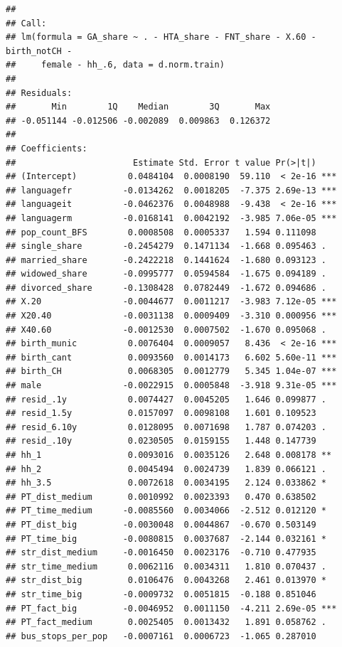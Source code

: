\documentclass[
]{article}
\begin{document}
\begin{verbatim}
## 
## Call:
## lm(formula = GA_share ~ . - HTA_share - FNT_share - X.60 - birth_notCH - 
##     female - hh_.6, data = d.norm.train)
## 
## Residuals:
##       Min        1Q    Median        3Q       Max 
## -0.051144 -0.012506 -0.002089  0.009863  0.126372 
## 
## Coefficients:
##                       Estimate Std. Error t value Pr(>|t|)    
## (Intercept)          0.0484104  0.0008190  59.110  < 2e-16 ***
## languagefr          -0.0134262  0.0018205  -7.375 2.69e-13 ***
## languageit          -0.0462376  0.0048988  -9.438  < 2e-16 ***
## languagerm          -0.0168141  0.0042192  -3.985 7.06e-05 ***
## pop_count_BFS        0.0008508  0.0005337   1.594 0.111098    
## single_share        -0.2454279  0.1471134  -1.668 0.095463 .  
## married_share       -0.2422218  0.1441624  -1.680 0.093123 .  
## widowed_share       -0.0995777  0.0594584  -1.675 0.094189 .  
## divorced_share      -0.1308428  0.0782449  -1.672 0.094686 .  
## X.20                -0.0044677  0.0011217  -3.983 7.12e-05 ***
## X20.40              -0.0031138  0.0009409  -3.310 0.000956 ***
## X40.60              -0.0012530  0.0007502  -1.670 0.095068 .  
## birth_munic          0.0076404  0.0009057   8.436  < 2e-16 ***
## birth_cant           0.0093560  0.0014173   6.602 5.60e-11 ***
## birth_CH             0.0068305  0.0012779   5.345 1.04e-07 ***
## male                -0.0022915  0.0005848  -3.918 9.31e-05 ***
## resid_.1y            0.0074427  0.0045205   1.646 0.099877 .  
## resid_1.5y           0.0157097  0.0098108   1.601 0.109523    
## resid_6.10y          0.0128095  0.0071698   1.787 0.074203 .  
## resid_.10y           0.0230505  0.0159155   1.448 0.147739    
## hh_1                 0.0093016  0.0035126   2.648 0.008178 ** 
## hh_2                 0.0045494  0.0024739   1.839 0.066121 .  
## hh_3.5               0.0072618  0.0034195   2.124 0.033862 *  
## PT_dist_medium       0.0010992  0.0023393   0.470 0.638502    
## PT_time_medium      -0.0085560  0.0034066  -2.512 0.012120 *  
## PT_dist_big         -0.0030048  0.0044867  -0.670 0.503149    
## PT_time_big         -0.0080815  0.0037687  -2.144 0.032161 *  
## str_dist_medium     -0.0016450  0.0023176  -0.710 0.477935    
## str_time_medium      0.0062116  0.0034311   1.810 0.070437 .  
## str_dist_big         0.0106476  0.0043268   2.461 0.013970 *  
## str_time_big        -0.0009732  0.0051815  -0.188 0.851046    
## PT_fact_big         -0.0046952  0.0011150  -4.211 2.69e-05 ***
## PT_fact_medium       0.0025405  0.0013432   1.891 0.058762 .  
## bus_stops_per_pop   -0.0007161  0.0006723  -1.065 0.287010    

\end{verbatim}
\end{document}
